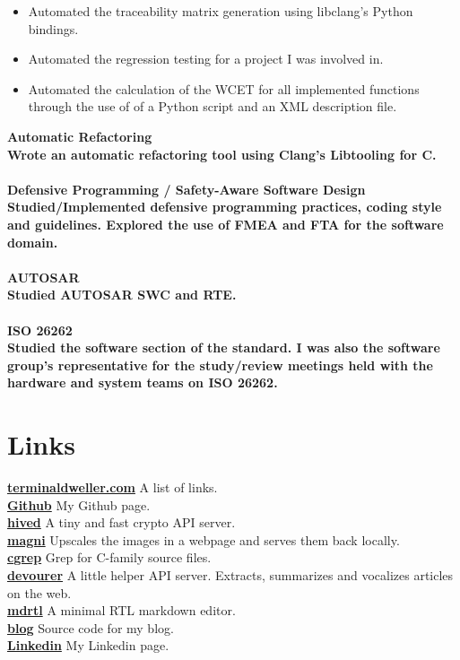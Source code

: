 \documentclass[8pt]{article}
\begin{document}
\begin{multicols}{2}
\begin{itemize}
\item Automated the traceability matrix generation using libclang's Python bindings.
\item Automated the regression testing for a project I was involved in.
\item Automated the calculation of the WCET for all implemented functions through the use of of a Python script and an XML description file.
  \end{itemize}
  \bf Automatic Refactoring\\ \normalfont Wrote an automatic refactoring tool using Clang's Libtooling for C.\\[5pt]
  \\
  \bf Defensive Programming / Safety-Aware Software Design\\ \normalfont Studied/Implemented defensive programming practices, coding style and guidelines. Explored the use of FMEA and FTA for the software domain.\\[5pt]
  \\
  \bf AUTOSAR\\ \normalfont Studied AUTOSAR SWC and RTE.\\[5pt]
  \\
  \bf ISO 26262\\ \normalfont Studied the software section of the standard. I was also the software group's representative for the study/review meetings held with the hardware and system teams on ISO 26262.\\[5pt]

  \section*{Links}
  {\bf \href{https://terminaldweller.com}{terminaldweller.com}} A list of links.\\[5pt]
  {\bf \href{https://github.com/terminaldweller}{Github}} My Github page.\\[5pt]
  {\bf \href{https://github.com/terminaldweller/hived/tree/arbitrage}{hived}} A tiny and fast crypto API server.\\[5pt]
  {\bf \href{https://github.com/terminaldweller/magni}{magni}} Upscales the images in a webpage and serves them back locally.\\[5pt]
  {\bf \href{https://github.com/terminaldweller/cgrep}{cgrep}} Grep for C-family source files.\\[5pt]
  {\bf \href{https://github.com/terminaldweller/devourer}{devourer}} A little helper API server. Extracts, summarizes and vocalizes articles on the web.\\[5pt]
  {\bf \href{https://github.com/terminaldweller/mdrtl}{mdrtl}} A minimal RTL markdown editor.\\[5pt]
  {\bf \href{https://github.com/terminaldweller/blog}{blog}} Source code for my blog.\\[5pt]
  {\bf \href{https://www.linkedin.com/in/farzad-sadeghi/}{Linkedin}} My Linkedin page.\\[5pt]

\end{multicols}
\end{document}
